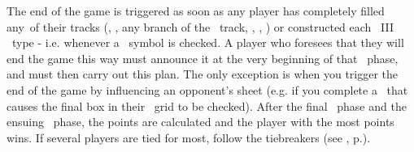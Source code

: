 The end of the game is triggered as soon as any player has completely filled any\
of their tracks (\population, \currency, any branch of the \tech\ track, 
\military, \trade, \culture) or constructed each \level\ III \armament\  type - 
i.e. whenever a \masterysymbol\ symbol is checked.
\newline\newline
A player who foresees that they will end the game this way must announce it at 
the very beginning of that \development\ phase, and must then carry out this 
plan.  The only exception is when you trigger the end of the game by influencing
 an opponent's sheet (e.g. if you complete a \convoy\ that causes the final box 
 in their \culture\ grid to be checked).
\newline\newline
After the final \development\ phase and the ensuing \deployment\ phase, the 
points are calculated and the player with the most points wins. If several 
players are tied for most, follow the tiebreakers (see \nameref{sec:scoring}, 
p.\pageref{sec:scoring}).
